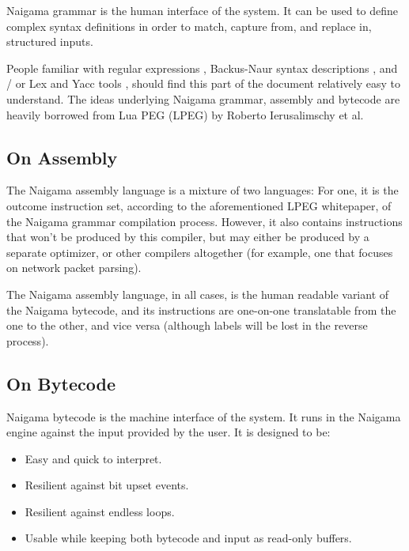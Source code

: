 Naigama grammar is the human interface of the system.
It can be used to define complex syntax definitions in order
to match, capture from, and replace in, structured inputs.

People familiar with regular expressions \cite{bib:regex},
Backus-Naur syntax descriptions \cite{bib:backusnaur},
and / or Lex and Yacc tools \cite{bib:yacc},
should find this part of the document relatively easy to understand.
The ideas underlying Naigama grammar, assembly and bytecode
are heavily borrowed from Lua PEG (LPEG) \cite{bib:peg}
by Roberto Ierusalimschy et al.

\subsection{On Assembly}

The Naigama assembly language is a mixture of two languages:
For one, it is the outcome instruction set, according to the
aforementioned LPEG whitepaper,
of the Naigama grammar compilation process. However, it also contains
instructions that won't be produced by this compiler, but may
either be produced by a separate optimizer, or other compilers
altogether (for example, one that focuses on network packet
parsing).

The Naigama assembly language, in all cases, is the human readable
variant of the Naigama bytecode, and its instructions are one-on-one
translatable from the one to the other, and vice versa
(although labels will be lost in the reverse process).

\subsection{On Bytecode}

Naigama bytecode is the machine interface of the system.
It runs in the Naigama engine against the input provided by the user.
It is designed to be:

\begin{itemize}

\item Easy and quick to interpret.
\item Resilient against bit upset events.
\item Resilient against endless loops.
\item Usable while keeping both bytecode and input as read-only buffers.

\end{itemize}
